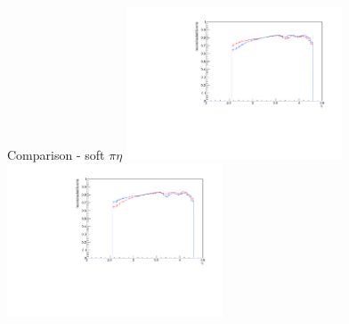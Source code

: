 \documentclass[11pt]{beamer}
\begin{document}
\begin{frame}{Comparison - soft $\pi \eta$}
\centering
\includegraphics[width=0.48\textwidth]{third/up_pdf/combined/h_eta_reco_SPi.pdf}
\includegraphics[width=0.48\textwidth]{third/down_pdf/combined/h_eta_reco_SPi.pdf}
\end{frame}
\end{document}
